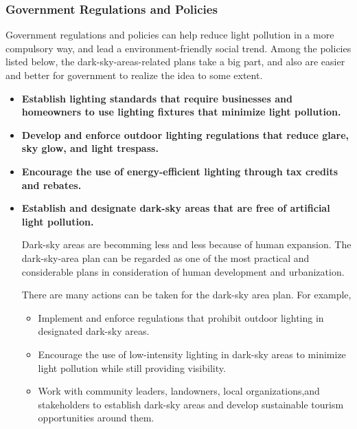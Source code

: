 \subsubsection{Government Regulations and Policies}
Government regulations and policies can help reduce light pollution in a more compulsory way, and lead a environment-friendly social trend. Among the policies listed below, the dark-sky-areas-related plans take a big part, and also are easier and better for government to realize the idea to some extent.
\begin{itemize}
    \item \textbf{Establish lighting standards that require businesses and homeowners to use lighting fixtures that minimize light pollution.}
    
    \item \textbf{Develop and enforce outdoor lighting regulations that reduce glare, sky glow, and light trespass.}
    
    \item \textbf{Encourage the use of energy-efficient lighting through tax credits and rebates.}

    \item \textbf{Establish and designate dark-sky areas that are free of artificial light pollution.} 
    
    Dark-sky areas are becomming less and less because of human expansion. The dark-sky-area plan can be regarded as one of the most practical and considerable plans in consideration of human development and urbanization. 
    
    There are many actions can be taken for the dark-sky area plan. For example, 
    \begin{itemize}
        \item Implement and enforce regulations that prohibit outdoor lighting in designated dark-sky areas.
        \item Encourage the use of low-intensity lighting in dark-sky areas to minimize light pollution while still providing visibility.
        \item Work with community leaders, landowners, local organizations,and stakeholders to establish dark-sky areas and develop sustainable tourism opportunities around them.
    \end{itemize}
\end{itemize}


